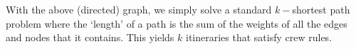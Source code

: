 With the above (directed) graph, we simply solve a standard $k-$shortest path problem where the `length' of a path is the sum of the weights of all the edges and nodes that it contains. This yields $k$ itineraries that satisfy crew rules.
